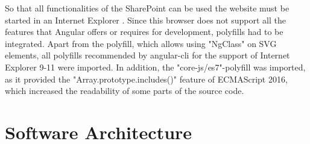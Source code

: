 \documentclass[Bachelor,BIF,english]{twbook}
\begin{document}
So that all functionalities of the SharePoint can be used the website must be started in an Internet Explorer \cite{IE}. Since this browser does not support all the features that Angular offers or requires for development, polyfills had to be integrated. Apart from the polyfill, which allows using "NgClass" on SVG elements, all polyfills recommended by angular-cli for the support of Internet Explorer 9-11 were imported. In addition, the "core-js/es7"-polyfill was imported, as it provided the "Array.prototype.includes()" feature of ECMAScript 2016, which increased the readability of some parts of the source code.

\section{Software Architecture}
\end{document}
